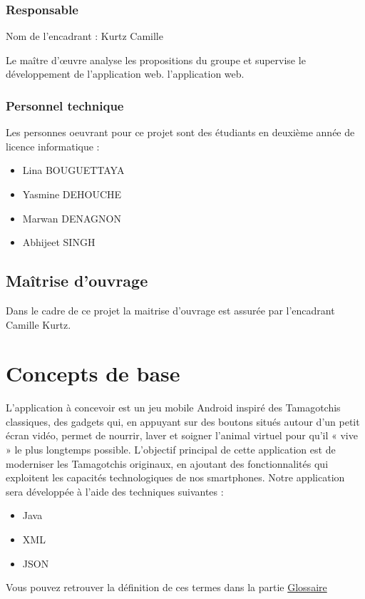 \documentclass{cahier_des_charges}
\begin{document}
\subsubsection{Responsable}
Nom de l'encadrant : Kurtz Camille 

Le maître d’œuvre analyse les propositions du groupe et supervise le développement de l'application web.
l'application web.
\subsubsection{Personnel technique}
Les personnes oeuvrant pour ce projet sont des étudiants en deuxième année de licence informatique :
\begin{itemize}[label=\textbullet]
\item Lina BOUGUETTAYA 
\item Yasmine DEHOUCHE
\item Marwan DENAGNON 
\item Abhijeet SINGH
\end{itemize}
\subsection{Maîtrise d'ouvrage}
Dans le cadre de ce projet la maitrise d’ouvrage est assurée par l’encadrant Camille Kurtz.
\section{Concepts de base}
L’application à concevoir est un jeu mobile Android inspiré des Tamagotchis classiques, des gadgets qui, en appuyant sur des boutons situés autour d'un petit écran vidéo, permet de nourrir, laver et soigner l'animal virtuel pour qu'il « vive » le plus longtemps possible. L’objectif principal de cette application est de moderniser les Tamagotchis originaux, en ajoutant des fonctionnalités qui exploitent les capacités technologiques de nos smartphones. Notre application sera développée à l’aide des techniques suivantes :
\begin{itemize}[label=\textbullet]
\item Java
\item XML
\item JSON
\end{itemize}
Vous pouvez retrouver la définition de ces termes dans la partie \protect\hyperref[sec:glossaire]{Glossaire}
\end{document}
